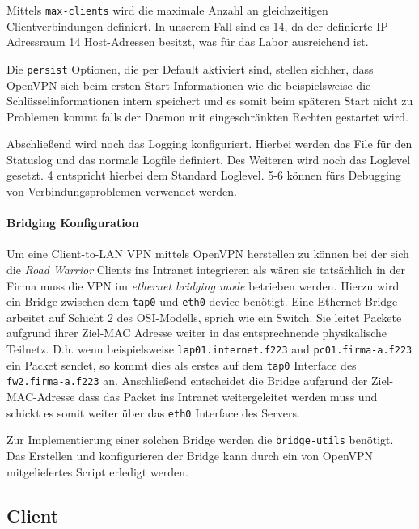 Mittels \texttt{max-clients} wird die maximale Anzahl an gleichzeitigen Clientverbindungen definiert. In unserem Fall sind es 14, da der definierte IP-Adressraum 14 Host-Adressen besitzt, was für das Labor ausreichend ist.

Die \texttt{persist} Optionen, die per Default aktiviert sind, stellen sichher, dass OpenVPN sich beim ersten Start Informationen wie die beispielsweise die Schlüsselinformationen intern speichert und es somit beim späteren Start nicht zu Problemen kommt falls der Daemon mit eingeschränkten Rechten gestartet wird.

Abschließend wird noch das Logging konfiguriert. Hierbei werden das File für den Statuslog und das normale Logfile definiert. Des Weiteren wird noch das Loglevel gesetzt. 4 entspricht hierbei dem Standard Loglevel. 5-6 können fürs Debugging von Verbindungsproblemen verwendet werden.

\paragraph{Bridging Konfiguration}

Um eine Client-to-LAN VPN mittels OpenVPN herstellen zu können bei der sich die \emph{Road Warrior} Clients ins Intranet integrieren als wären sie tatsächlich in der Firma muss die VPN im \emph{ethernet bridging mode} betrieben werden. Hierzu wird ein Bridge zwischen dem \texttt{tap0} und \texttt{eth0} device benötigt. Eine Ethernet-Bridge arbeitet auf Schicht 2 des OSI-Modells, sprich wie ein Switch. Sie leitet Packete aufgrund ihrer Ziel-MAC Adresse weiter in das entsprechnende physikalische Teilnetz. D.h. wenn beispielsweise \texttt{lap01.internet.f223} and \texttt{pc01.firma-a.f223} ein Packet sendet, so kommt dies als erstes auf dem \texttt{tap0} Interface des \texttt{fw2.firma-a.f223} an. Anschließend entscheidet die Bridge aufgrund der Ziel-MAC-Adresse dass das Packet ins Intranet weitergeleitet werden muss und schickt es somit weiter über das \texttt{eth0} Interface des Servers.

Zur Implementierung einer solchen Bridge werden die \texttt{bridge-utils} benötigt. Das Erstellen und konfigurieren der Bridge kann durch ein von OpenVPN mitgeliefertes Script erledigt werden.


\subsection{Client}
